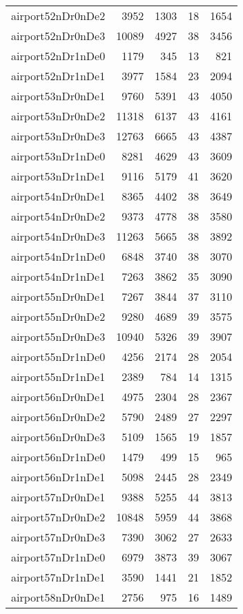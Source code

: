 \begin{longtable}{lrrrr}
airport52nDr0nDe2 & 3952 & 1303 & 18 & 1654 \\
airport52nDr0nDe3 & 10089 & 4927 & 38 & 3456 \\
airport52nDr1nDe0 & 1179 & 345 & 13 & 821 \\
airport52nDr1nDe1 & 3977 & 1584 & 23 & 2094 \\
airport53nDr0nDe1 & 9760 & 5391 & 43 & 4050 \\
airport53nDr0nDe2 & 11318 & 6137 & 43 & 4161 \\
airport53nDr0nDe3 & 12763 & 6665 & 43 & 4387 \\
airport53nDr1nDe0 & 8281 & 4629 & 43 & 3609 \\
airport53nDr1nDe1 & 9116 & 5179 & 41 & 3620 \\
airport54nDr0nDe1 & 8365 & 4402 & 38 & 3649 \\
airport54nDr0nDe2 & 9373 & 4778 & 38 & 3580 \\
airport54nDr0nDe3 & 11263 & 5665 & 38 & 3892 \\
airport54nDr1nDe0 & 6848 & 3740 & 38 & 3070 \\
airport54nDr1nDe1 & 7263 & 3862 & 35 & 3090 \\
airport55nDr0nDe1 & 7267 & 3844 & 37 & 3110 \\
airport55nDr0nDe2 & 9280 & 4689 & 39 & 3575 \\
airport55nDr0nDe3 & 10940 & 5326 & 39 & 3907 \\
airport55nDr1nDe0 & 4256 & 2174 & 28 & 2054 \\
airport55nDr1nDe1 & 2389 & 784 & 14 & 1315 \\
airport56nDr0nDe1 & 4975 & 2304 & 28 & 2367 \\
airport56nDr0nDe2 & 5790 & 2489 & 27 & 2297 \\
airport56nDr0nDe3 & 5109 & 1565 & 19 & 1857 \\
airport56nDr1nDe0 & 1479 & 499 & 15 & 965 \\
airport56nDr1nDe1 & 5098 & 2445 & 28 & 2349 \\
airport57nDr0nDe1 & 9388 & 5255 & 44 & 3813 \\
airport57nDr0nDe2 & 10848 & 5959 & 44 & 3868 \\
airport57nDr0nDe3 & 7390 & 3062 & 27 & 2633 \\
airport57nDr1nDe0 & 6979 & 3873 & 39 & 3067 \\
airport57nDr1nDe1 & 3590 & 1441 & 21 & 1852 \\
airport58nDr0nDe1 & 2756 & 975 & 16 & 1489 \\

\end{longtable}
